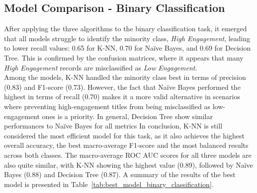 \subsection{Model Comparison - Binary Classification}
After applying the three algorithms to the binary classification task, it emerged that all models struggle to identify the minority class, 
\textit{High Engagement}, leading to lower recall values: 0.65 for K-NN, 0.70 for Naïve Bayes, and 0.69 for Decision Tree. 
This is confirmed by the confusion matrices, where it appears that many \textit{High Engagement} records are misclassified as \textit{Low Engagement}.\\

Among the models, K-NN handled the minority class best in terms of precision (0.83) and F1-score (0.73). 
However, the fact that Naïve Bayes performed the highest in terms of recall (0.70) makes it a more valid alternative in scenarios where preventing 
high-engagement titles from being misclassified as low-engagement ones is a priority. In general, Decision Tree show similar performances to Naïve Bayes for all metrics
In conclusion, K-NN is still considered the most efficient model for this task, as it also achieves the highest overall accuracy, 
the best macro-average F1-score and the most balanced results across both classes. 
The macro-average ROC AUC scores for all three models are also quite similar, with K-NN showing the highest value (0.89), 
followed by Naïve Bayes (0.88) and Decision Tree (0.87).
A summary of the results of the best model is presented in Table~\ref{tab:best_model_binary_classification}.

